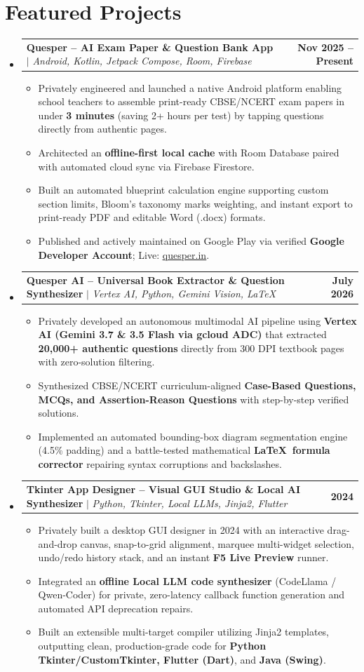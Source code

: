 \documentclass[letterpaper,10pt]{article}
\makeatletter
\newcommand{\resumeItem}[1]{
  \item\small{
    {#1 \vspace{-2pt}}
  }
}
\newcommand{\resumeProjectHeading}[2]{
  \vspace{-2pt}\item
    \begin{tabular*}{0.98\textwidth}{l@{\extracolsep{\fill}}r}
      \small#1 & \textbf{\small #2}\\
    \end{tabular*}\vspace{-5pt}
}
\newcommand{\resumeSubHeadingListStart}{\begin{itemize}[leftmargin=0.15in, label={}]}
\newcommand{\resumeSubHeadingListEnd}{\end{itemize}}
\newcommand{\resumeItemListStart}{\begin{itemize}[leftmargin=0.15in]}
\newcommand{\resumeItemListEnd}{\end{itemize}\vspace{-5pt}}
\makeatother
\begin{document}
\section{Featured Projects}
    \resumeSubHeadingListStart
      \resumeProjectHeading
          {\textbf{Quesper -- AI Exam Paper \& Question Bank App} $|$ \emph{Android, Kotlin, Jetpack Compose, Room, Firebase}}{Nov 2025 -- Present}
          \resumeItemListStart
            \resumeItem{Privately engineered and launched a native Android platform enabling school teachers to assemble print-ready CBSE/NCERT exam papers in under \textbf{3 minutes} (saving 2+ hours per test) by tapping questions directly from authentic pages.}
            \resumeItem{Architected an \textbf{offline-first local cache} with Room Database paired with automated cloud sync via Firebase Firestore.}
            \resumeItem{Built an automated blueprint calculation engine supporting custom section limits, Bloom's taxonomy marks weighting, and instant export to print-ready PDF and editable Word (.docx) formats.}
            \resumeItem{Published and actively maintained on Google Play via verified \textbf{Google Developer Account}; Live: \href{https://quesper.in}{\underline{quesper.in}}.}
          \resumeItemListEnd

      \resumeProjectHeading
          {\textbf{Quesper AI -- Universal Book Extractor \& Question Synthesizer} $|$ \emph{Vertex AI, Python, Gemini Vision, LaTeX}}{July 2026}
          \resumeItemListStart
            \resumeItem{Privately developed an autonomous multimodal AI pipeline using \textbf{Vertex AI (Gemini 3.7 \& 3.5 Flash via gcloud ADC)} that extracted \textbf{20,000+ authentic questions} directly from 300 DPI textbook pages with zero-solution filtering.}
            \resumeItem{Synthesized CBSE/NCERT curriculum-aligned \textbf{Case-Based Questions, MCQs, and Assertion-Reason Questions} with step-by-step verified solutions.}
            \resumeItem{Implemented an automated bounding-box diagram segmentation engine (4.5\% padding) and a battle-tested mathematical \textbf{\LaTeX\ formula corrector} repairing syntax corruptions and backslashes.}
          \resumeItemListEnd

      \resumeProjectHeading
          {\textbf{Tkinter App Designer -- Visual GUI Studio \& Local AI Synthesizer} $|$ \emph{Python, Tkinter, Local LLMs, Jinja2, Flutter}}{2024}
          \resumeItemListStart
            \resumeItem{Privately built a desktop GUI designer in 2024 with an interactive drag-and-drop canvas, snap-to-grid alignment, marquee multi-widget selection, undo/redo history stack, and an instant \textbf{F5 Live Preview} runner.}
            \resumeItem{Integrated an \textbf{offline Local LLM code synthesizer} (CodeLlama / Qwen-Coder) for private, zero-latency callback function generation and automated API deprecation repairs.}
            \resumeItem{Built an extensible multi-target compiler utilizing Jinja2 templates, outputting clean, production-grade code for \textbf{Python Tkinter/CustomTkinter, Flutter (Dart)}, and \textbf{Java (Swing)}.}
          \resumeItemListEnd
    \resumeSubHeadingListEnd
\end{document}
